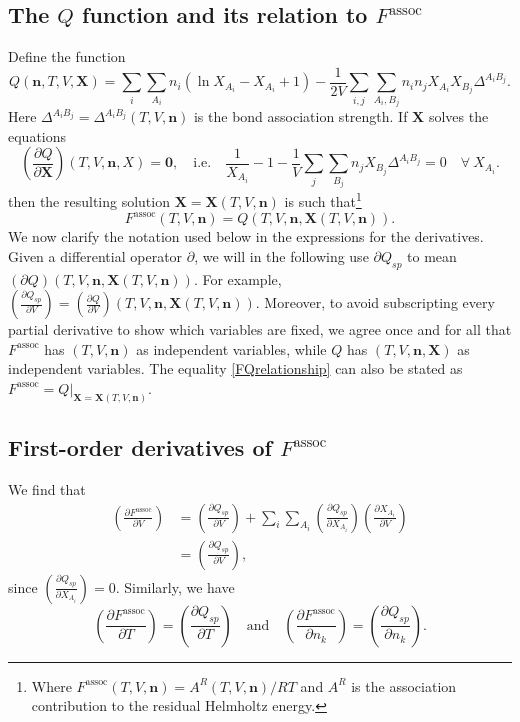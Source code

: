 \documentclass[internal,english]{sintefmemo2012}
\newcommand{\mbf}[0]{\mathbf}
\newcommand*{\pder}[2]{\left(\frac{\partial #1}{\partial #2}\right)}
\newcommand{\lp}{\left(}
\newcommand{\rp}{\right)}
\begin{document}
\subsection{The $Q$ function and its relation to $F^{\text{assoc}}$}
Define the function
\begin{equation}
  Q(\mbf n,T,V,\mathbf{X}) = \sum_i \sum_{A_i} n_i \lp \ln X_{A_i} - X_{A_i} + 1\rp - \frac{1}{2V} \sum_{i,j} \sum_{A_i, B_j} n_i n_j X_{A_i} X_{B_j} \Delta^{A_i B_j}.
\end{equation}
Here $\Delta^{A_i B_j} = \Delta^{A_i B_j}(T,V,\mbf n)$ is the bond association
strength. If $\mbf X$ solves the equations
\begin{equation}
  \pder{Q}{\mbf X}(T,V,\mbf n,X) = \mbf 0, \quad \text{i.e.} \quad   \frac{1}{X_{A_i}} - 1 - \frac{1}{V} \sum_j \sum_{B_j} n_j X_{B_j} \Delta^{A_i B_j} = 0 \quad \forall \ X_{A_i}.
\end{equation}
then the resulting solution $\mbf X = \mbf X(T,V,\mbf n)$ is such
that\footnote{Where $F^{\text{assoc}}(T,V,\mbf n) = A^{R}(T,V,\mbf n)/RT$ and
  $A^R$ is the association contribution to the residual Helmholtz energy.}
\begin{equation}
  \label{FQrelationship}
  F^{\text{assoc}}(T,V,\mbf n) = Q(T,V,\mbf n, \mbf X(T,V,\mbf n)).
\end{equation}
We now clarify the notation used below in the expressions for the
derivatives. Given a differential operator $\partial$, we will in the following
use $\partial Q_{sp}$ to mean $(\partial Q)(T,V,\mbf n,\mbf X(T,V,\mbf n))$. For
example, $\pder{Q_{sp}}{V} = \pder{Q}{V}(T,V,\mbf n,\mbf X(T,V,\mbf
n))$. Moreover, to avoid subscripting every partial derivative to show which
variables are fixed, we agree once and for all that $F^{\text{assoc}}$ has
$(T,V,\mbf n)$ as independent variables, while $Q$ has $(T,V,\mbf n,\mbf X)$ as
independent variables. The equality \eqref{FQrelationship} can also be stated as
$F^{\text{assoc}} = Q|_{\mbf X = \mbf X(T,V,\mbf n)}$.

\subsection{First-order derivatives of $F^{\text{assoc}}$} \label{first-order derivatives}
We find that
\begin{align*}
\pder{F^{\text{assoc}}}{V} &= \pder{Q_{sp}}{V}  + \sum_i \sum_{A_i} \pder{Q_{sp}}{X_{A_i}} \pder{X_{A_i}}{V} \\
& = \pder{Q_{sp}}{V},
\end{align*}
since $\pder{Q_{sp}}{X_{A_i}} = 0$. Similarly, we have
$$
\pder{F^{\text{assoc}}}{T} = \pder{Q_{sp}}{T} \quad \text{and} \quad \pder{F^{\text{assoc}}}{n_k} = \pder{Q_{sp}}{n_k}.
$$
\end{document}
